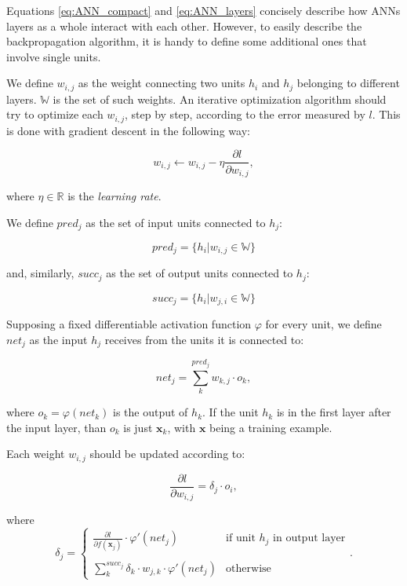 Equations \eqref{eq:ANN_compact} and \eqref{eq:ANN_layers} concisely describe how ANNs layers as a whole interact with each other. However, to easily describe the backpropagation algorithm, it is handy to define some additional ones that involve single units.

We define $w_{i,j}$ as the weight connecting two units $h_i$ and $h_j$ belonging to different layers. $\mathbb{W}$ is the set of such weights. An iterative optimization algorithm should try to optimize each $w_{i,j}$, step by step, according to the error measured by $l$. This is done with gradient descent in the following way:

\begin{equation}
w_{i,j} \gets w_{i,j} - \eta \frac{\partial l}{\partial w_{i,j}},
\end{equation}

where $\eta \in \mathbb{R}$ is the \textit{learning rate}.

We define $pred_j$ as the set of input units connected to $h_j$:

\[
pred_j = \{h_i | w_{i,j} \in \mathbb{W} \}
\]

and, similarly, $succ_j$ as the set of output units connected to $h_j$:

\[
succ_j = \{h_i | w_{j,i} \in \mathbb{W} \}
\]

Supposing a fixed differentiable activation function $\varphi$ for every unit, we define $net_j$ as the input $h_j$ receives from the units it is connected to:

\[
net_j = \sum\limits_{k}^{pred_j} w_{k,j} \cdot o_k,
\]

where $o_k = \varphi(net_k)$ is the output of $h_k$. If the unit $h_k$ is in the first layer after the input layer, than $o_k$ is just $\bm{x}_k$, with $\bm{x}$ being a training example.

Each weight $w_{i,j}$ should be updated according to:

\begin{equation}
\label{eq:bp_final}
\frac{\partial l}{\partial w_{i,j}} = \delta_j \cdot o_i,
\end{equation}

where
\[
\delta_j =
\begin{cases}
     \frac{\partial l}{\partial f(\bm{x}_j)} \cdot \varphi\prime(net_j) & \text{if unit $h_j$ in output layer} \\ \\
     \sum\limits_{k}^{succ_j} \delta_k \cdot w_{j,k} \cdot \varphi\prime(net_j) & \text{otherwise}
\end{cases}.
\]

